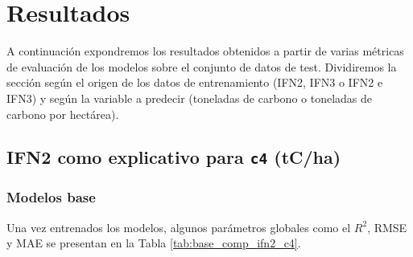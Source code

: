 \section{Resultados}\label{anexo:resultados}

A continuación expondremos los resultados obtenidos a partir de varias métricas de evaluación de los modelos sobre el conjunto de datos de test. Dividiremos la sección según el origen de los datos de entrenamiento (IFN2, IFN3 o IFN2 e IFN3) y según la variable a predecir (toneladas de carbono o toneladas de carbono por hectárea).

\subsection{IFN2 como explicativo para \texttt{c4} (tC/ha)}

\subsubsection{Modelos base}

Una vez entrenados los modelos, algunos parámetros globales como el $R^2$, RMSE y MAE se presentan en la Tabla \ref{tab:base_comp_ifn2_c4}.

